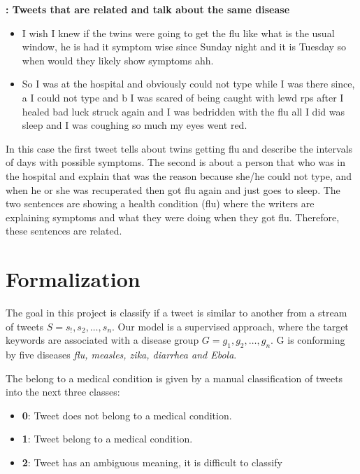 \documentclass[12pt]{report}
\begin{document}
\begin{definition} {\bf : Tweets that are  related  and talk about the same disease}
	\begin{itemize}[nolistsep]
		\item I wish I knew if the twins were going to get the flu like what is the usual window, he is had it symptom wise since Sunday night and it is Tuesday so when would they likely show symptoms ahh.
		\item So I was at the hospital and obviously could not type while I was there since, a I could not type and b I was scared of being caught with lewd rps after I healed bad luck struck again and I was bedridden with the flu all I did was sleep and I was coughing so much my eyes went red.
	\end{itemize}
\end{definition}
In this case the first tweet tells about twins getting flu and describe the intervals of days with possible symptoms. The second is about a person that who was in the hospital and explain that was the reason because she/he could not type, and when he or she was recuperated then got flu again and just goes to sleep. The two sentences are showing a health condition (flu) where the writers are explaining symptoms and what they were doing when they got flu. Therefore, these sentences are related.

\section{Formalization}\label{formalization_problem}

The goal in this project is classify if a tweet is similar to another from a stream of tweets $S = {s_!, s_2, … , s_n}$. Our model is a supervised approach, where the target keywords are associated with a disease group $G = {g_1, g_2, …, g_n}$. G is conforming by five diseases \textit{flu, measles, zika, diarrhea and Ebola}.

The belong to a medical condition is given by a manual classification of tweets into the next three classes:

\begin{itemize}[nolistsep]
	\item \textbf{0}: Tweet does not belong to a medical condition.
	\item  \textbf{1}: Tweet belong to a medical condition.
	\item \textbf{2}: Tweet has an ambiguous meaning, it is difficult to classify 
\end{itemize}
\end{document}
